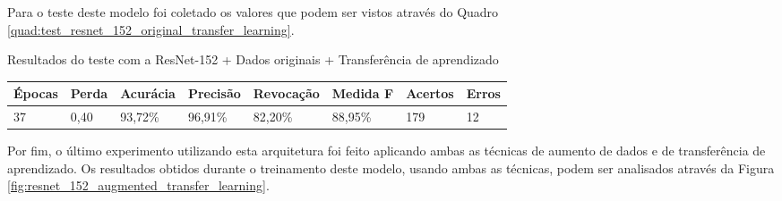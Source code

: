 \documentclass[
	12pt,				%
	oneside,			%
	a4paper,			%
	english,			%
	brazil				%
	]{abntex2ppgsi}
\begin{document}
Para o teste deste modelo foi coletado os valores que podem ser vistos através do Quadro \ref{quad:test_resnet_152_original_transfer_learning}.

\begin{quadro}[H]
\caption{Resultados do teste com a ResNet-152 + Dados originais + Transferência de aprendizado}
\label{quad:test_resnet_152_original_transfer_learning}
\centering
\begin{tabular}{|l|l|l|l|l|l|l|l|}
\cline{1-8}
Épocas & Perda & Acurácia & Precisão & Revocação & Medida F & Acertos & Erros \\ \hline
37 & 0,40 & 93,72\% & 96,91\% & 82,20\% & 88,95\% & 179 & 12 \\
\cline{1-8}
\end{tabular}
\end{quadro}

Por fim, o último experimento utilizando esta arquitetura foi feito aplicando ambas as técnicas de aumento de dados e de transferência de aprendizado. Os resultados obtidos durante o treinamento deste modelo, usando ambas as técnicas, podem ser analisados através da Figura \ref{fig:resnet_152_augmented_transfer_learning}.
\end{document}
